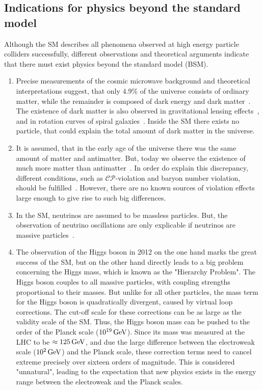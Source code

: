 \subsection{Indications for physics beyond the standard model}\label{sec:SM_bsm}
Although the SM describes all phenomena observed at high energy particle colliders successfully, different observations and theoretical arguments indicate that there must exist physics beyond the standard model (BSM).
\begin{enumerate}
\item Precise measurements of the cosmic microwave background and theoretical interpretations suggest, that only $4.9\%$ of the universe consists of ordinary matter, while the remainder is composed of dark energy and dark matter~\cite{DarkMatterPlanck}. The existence of dark matter is also observed in gravitational lensing effects~\cite{DarkMatterLensing}, and in rotation curves of spiral galaxies~\cite{DarkMatterRotation}. Inside the SM there exists no particle, that could explain the total amount of dark matter in the universe.
\item It is assumed, that in the early age of the universe there was the same amount of matter and antimatter. But, today we observe the existence of much more matter than antimatter~\cite{Antimatter,AsymSM}. In order do explain this discrepancy, different conditions, such as $\mathcal{CP}$-violation and baryon number violation, should be fulfilled~\cite{Sakharov}. However, there are no known sources of violation effects large enough to give rise to such big differences.
\item In the SM, neutrinos are assumed to be massless particles. But, the observation of neutrino oscillations are only explicable if neutrinos are massive particles~\cite{NeutrinoMass,PDG}.
\item The observation of the Higgs boson in 2012 on the one hand marks the great success of the SM, but on the other hand directly leads to a big problem concerning the Higgs mass, which is known as the "Hierarchy Problem". The Higgs boson couples to all massive particles, with coupling strengths proportional to their masses. But unlike for all other particles, the mass term for the Higgs boson is quadratically divergent, caused by virtual loop corrections. The cut-off scale for these corrections can be as large as the validity scale of the SM. Thus, the Higgs boson mass can be pushed to the order of the Planck scale ($10^{19}\,\text{Ge\hspace{-.08em}V}$). Since its mass was measured at the LHC to be $\approx 125\,\text{Ge\hspace{-.08em}V}$, and due the large difference between the electroweak scale ($10^2\,\text{Ge\hspace{-.08em}V}$) and the Planck scale, these correction terms need to cancel extreme precisely over sixteen orders of magnitude. This is considered "unnatural", leading to the expectation that new physics exists in the energy range between the electroweak and the Planck scales.

\end{enumerate}
